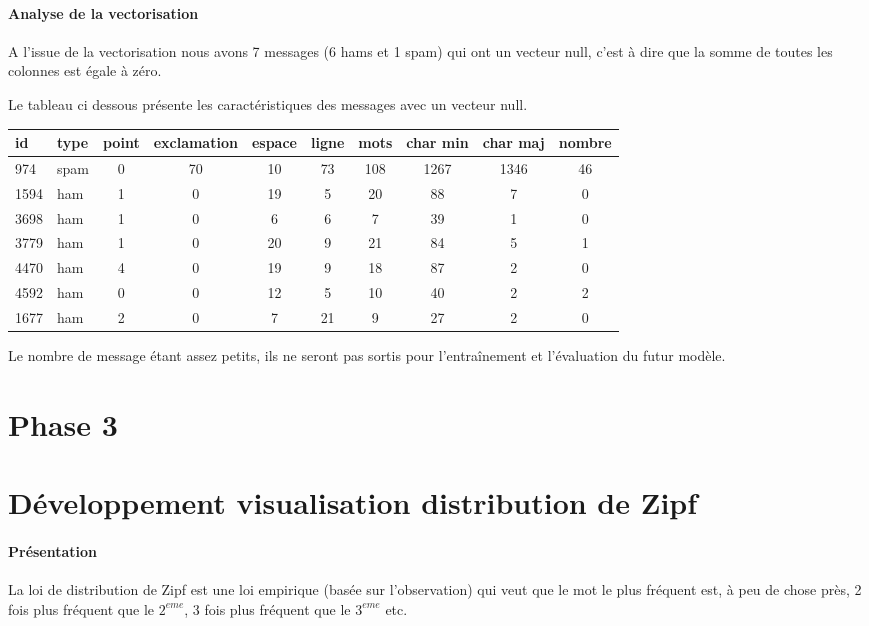 \documentclass[a4paper,12pt]{article}
\begin{document}
		\paragraph{Analyse de la vectorisation}
			A l'issue de la vectorisation nous avons 7 messages (6 hams et 1 spam) qui ont un vecteur null, c'est à dire que la somme de toutes les colonnes est égale à zéro.
			
			Le tableau ci dessous présente les caractéristiques des messages avec un vecteur null.
			
			\begin{tabular}{|l|l|c|c|c|c|c|c|c|c|}
				\hline
				id & type & point & exclamation & espace & ligne & mots & char min & char maj & nombre \\
				\hline
				974 & spam & 0 & 70 & 10 & 73 & 108 & 1267 & 1346 & 46 \\
				\hline
				1594 & ham & 1 & 0 & 19 & 5 & 20 & 88 & 7 & 0 \\
				\hline
				3698 & ham & 1 & 0 & 6 & 6 & 7 & 39 & 1 & 0 \\
				\hline
				3779 & ham & 1 & 0 & 20 & 9 & 21 & 84 & 5 & 1 \\
				\hline
				4470 & ham & 4 & 0 & 19 & 9 & 18 & 87 & 2 & 0 \\
				\hline
				4592 & ham & 0 & 0 & 12 & 5 & 10 & 40 & 2 & 2 \\
				\hline
				1677 & ham & 2 & 0 & 7 & 21 & 9 & 27 & 2 & 0 \\
				\hline
			\end{tabular}
			
			Le nombre de message étant assez petits, ils ne seront pas sortis pour l’entraînement et l'évaluation du futur modèle. 

\newpage
\section{Phase 3}


\newpage	
\appendix
\section{Développement visualisation distribution de Zipf}
	\label{sec:devZipf}
	\paragraph{Présentation}
		La loi de distribution de Zipf est une loi empirique (basée sur l'observation) qui veut que le mot le plus fréquent est, à peu de chose près, 2 fois plus fréquent que le $2^{eme}$, 3 fois plus fréquent que le $3^{eme}$ etc.\\
		
\end{document}
